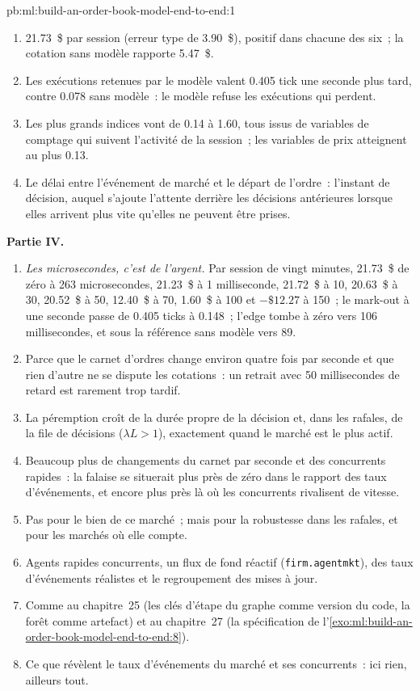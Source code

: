 \begin{solution}{pb:ml:build-an-order-book-model-end-to-end:1}
\begin{enumerate}[resume]
\item 21.73~\$ par session (erreur type de 3.90~\$), positif dans chacune des six~; la cotation sans modèle rapporte 5.47~\$.
\item Les exécutions retenues par le modèle valent 0.405 tick une seconde plus tard, contre 0.078 sans modèle~: le modèle refuse les exécutions qui
perdent.
\item Les plus grands indices vont de 0.14 à 1.60, tous issus de variables de comptage qui suivent l'activité de la session~; les variables de prix atteignent au plus 0.13.
\item Le délai entre l'événement de marché et le départ de l'ordre~: l'instant de décision, auquel s'ajoute l'attente derrière les décisions antérieures lorsque
elles arrivent plus vite qu'elles ne peuvent être prises.
\end{enumerate}
\textbf{Partie IV.}
\begin{enumerate}[resume]
\item \emph{Les microsecondes, c'est de l'argent.} Par session de vingt minutes, 21.73~\$ de zéro à 263 microsecondes, 21.23~\$ à 1 milliseconde,
21.72~\$ à 10, 20.63~\$ à 30, 20.52~\$ à 50, 12.40~\$ à 70, 1.60~\$ à 100 et $-\$12.27$ à 150~; le mark-out à une seconde passe de
0.405 ticks à 0.148~; l'edge tombe à zéro vers 106 millisecondes, et sous la référence sans modèle vers 89.
\item Parce que le carnet d'ordres change environ quatre fois par seconde et que rien d'autre ne se dispute les cotations~: un retrait avec 50 millisecondes de retard
est rarement trop tardif.
\item La péremption croît de la durée propre de la décision et, dans les rafales, de la file de décisions ($\lambda L>1$), exactement quand le marché
est le plus actif.
\item Beaucoup plus de changements du carnet par seconde et des concurrents rapides~: la falaise se situerait plus près de zéro dans le rapport des taux d'événements, et
encore plus près là où les concurrents rivalisent de vitesse.
\item Pas pour le bien de ce marché~; mais pour la robustesse dans les rafales, et pour les marchés où elle compte.
\item Agents rapides concurrents, un flux de fond réactif (\texttt{firm.agentmkt}), des taux d'événements réalistes et le regroupement des mises à jour.
\item Comme au chapitre~25 (les clés d'étape du graphe comme version du code, la forêt comme artefact) et au chapitre~27 (la spécification
de l'\cref{exo:ml:build-an-order-book-model-end-to-end:8}).
\item Ce que révèlent le taux d'événements du marché et ses concurrents~: ici rien, ailleurs tout.
\end{enumerate}
\end{solution}

